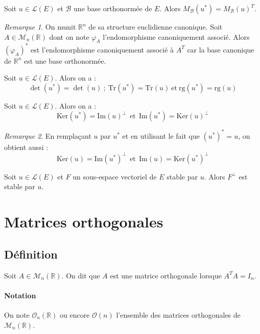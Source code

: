\documentclass[french]{article}
\newcommand{\R}{\mathbb{R}}
\newcommand{\st}{^*}
\renewcommand{\ker}{\text{Ker}}
\newcommand{\Tr}{\text{Tr}}
\theoremstyle{plain}
\theoremstyle{definition}
\theoremstyle{remark}
\newtheorem*{rmq}{Remarque}
\begin{document}
\begin{thm}{}
	Soit $u\in\mathcal{L}(E)$ et $\mathcal{B}$ une base orthonormée de $E$. Alors $M_\mathcal{B}(u\st)=M_\mathcal{B}(u)^T$.
\end{thm}

\begin{rmq}
	On munit $\R^n$ de sa structure euclidienne canonique. Soit $A\in\mathcal{M}_n(\R)$ dont on note $\varphi_A$ l'endomorphisme canoniquement associé. Alors $(\varphi_A)\st$ est l'endomorphisme canoniquement associé à $A^T$ car la base canonique de $\R^n$ est une base orthonormée.
\end{rmq}

\begin{thm}{}
	Soit $u\in\mathcal{L}(E)$. Alors on a : $$\det(u\st)=\det(u)\ ; \ \Tr(u\st)=\Tr(u)\ \text{et}\ \text{rg}(u\st)=\text{rg}(u)$$
\end{thm}

\begin{thm}{}
	Soit $u\in\mathcal{L}(E)$. Alors on a : $$\ker(u\st)=\text{Im}(u)^\bot \ \ \text{et} \ \ \text{Im}(u\st)=\ker(u)^\bot$$
\end{thm}

\begin{rmq}
	En remplaçant $u$ par $u\st$ et en utilisant le fait que $(u\st)\st=u$, on obtient aussi : $$\ker(u)=\text{Im}(u\st)^\bot \ \ \text{et} \ \ \text{Im}(u)=\ker(u\st)^\bot$$
\end{rmq}

\begin{thm}{}
	Soit $u\in\mathcal{L}(E)$ et $F$ un sous-espace vectoriel de $E$ stable par $u$. Alors $F^\bot$ est stable par $u$.
\end{thm}

\section{Matrices orthogonales}

\subsection{Définition}

\begin{dfn}
	Soit $A\in\mathcal{M}_n(\R)$. On dit que $A$ est une matrice orthogonale lorsque $A^TA=I_n$.
\end{dfn}

\paragraph{Notation} On note $\mathcal{O}_n(\R)$ ou encore $\mathcal{O}(n)$ l'ensemble des matrices orthogonales de $\mathcal{M}_n(\R)$.
\end{document}
